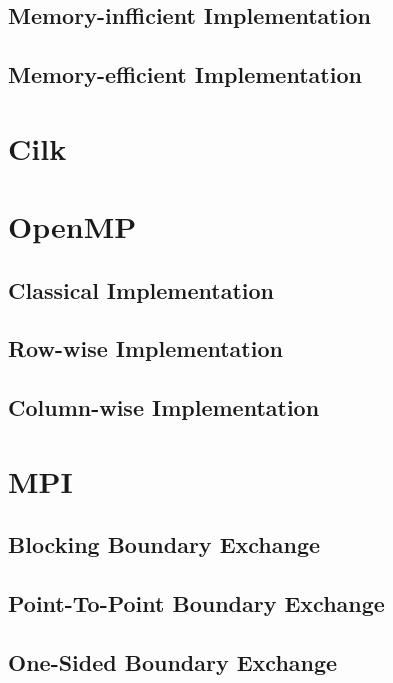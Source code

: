 \documentclass[11pt,a4paper]{article}
\begin{document}
\subsection{Memory-infficient Implementation}
\subsection{Memory-efficient Implementation}

\section{Cilk}


\section{OpenMP}
\subsection{Classical Implementation}
\subsection{Row-wise Implementation}
\subsection{Column-wise Implementation}

\section{MPI}
\subsection{Blocking Boundary Exchange}
\subsection{Point-To-Point Boundary Exchange}
\subsection{One-Sided Boundary Exchange}
\end{document}
